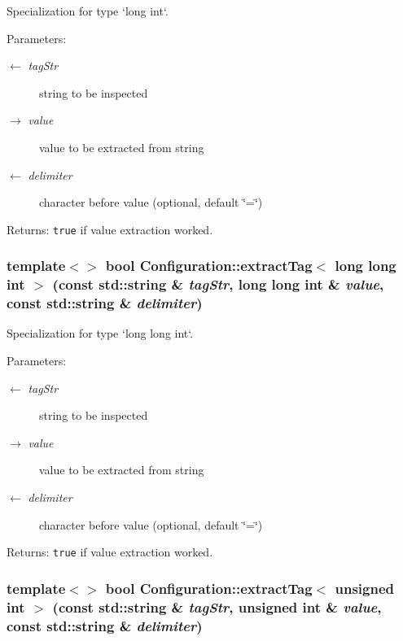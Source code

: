 Specialization for type `long int`. 

\begin{Desc}
\item[Parameters:]
\begin{description}
\item[\mbox{$\leftarrow$} {\em tag\-Str}]string to be inspected \item[\mbox{$\rightarrow$} {\em value}]value to be extracted from string \item[\mbox{$\leftarrow$} {\em delimiter}]character before value (optional, default \char`\"{}=\char`\"{})\end{description}
\end{Desc}
\begin{Desc}
\item[Returns:]{\tt true} if value extraction worked. \end{Desc}
\hypertarget{namespaceConfiguration_e1178315ef9eec7f06ba80c1ef2acb5f}{
\subsubsection[extractTag]{\setlength{\rightskip}{0pt plus 5cm}template$<$$>$ bool Configuration::extract\-Tag$<$ long long int $>$ (const std::string \& {\em tag\-Str}, long long int \& {\em value}, const std::string \& {\em delimiter})}}
\label{namespaceConfiguration_e1178315ef9eec7f06ba80c1ef2acb5f}


Specialization for type `long long int`. 

\begin{Desc}
\item[Parameters:]
\begin{description}
\item[\mbox{$\leftarrow$} {\em tag\-Str}]string to be inspected \item[\mbox{$\rightarrow$} {\em value}]value to be extracted from string \item[\mbox{$\leftarrow$} {\em delimiter}]character before value (optional, default \char`\"{}=\char`\"{})\end{description}
\end{Desc}
\begin{Desc}
\item[Returns:]{\tt true} if value extraction worked. \end{Desc}
\hypertarget{namespaceConfiguration_2ccfdb18a3633ba97cd30f7d5ff1b198}{
\subsubsection[extractTag]{\setlength{\rightskip}{0pt plus 5cm}template$<$$>$ bool Configuration::extract\-Tag$<$ unsigned int $>$ (const std::string \& {\em tag\-Str}, unsigned int \& {\em value}, const std::string \& {\em delimiter})}}
\label{namespaceConfiguration_2ccfdb18a3633ba97cd30f7d5ff1b198}


